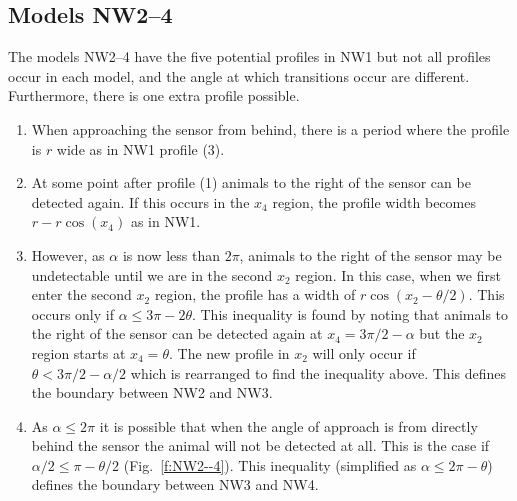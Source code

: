 \subsection{Models NW2--4} \label{NW2--4}
The models NW2--4 have the five potential profiles in NW1 but not all profiles occur in each model, and the angle at which transitions occur are different. Furthermore, there is one extra profile possible. 
\begin{enumerate}
\item When approaching the sensor from behind, there is a period where the profile is $r$ wide as in NW1 profile (3). 
\item At some point after profile (1) animals to the right of the sensor can be detected again. If this occurs in the $x_4$ region, the profile width becomes  $r - r\cos(x_4)$ as in NW1.
\item However, as $\alpha$ is now less than $2\pi$, animals to the right of the sensor may be undetectable until we are in the second $x_2$ region. In this case, when we first enter the second $x_2$ region, the profile has a width of $r\cos(x_2 - \theta/2)$. This occurs only if $\alpha \le 3\pi - 2\theta$. This inequality is found by noting that animals to the right of the sensor can be detected again at $x_4 = 3\pi/2 - \alpha$ but the $x_2$ region starts at $x_4 = \theta$. The new profile in $x_2$ will only occur if  $ \theta < 3\pi/2 - \alpha/2$ which is rearranged to find the inequality above. This defines the boundary between NW2 and NW3.
\item As $\alpha \le 2\pi$ it is possible that when the angle of approach is from directly behind the sensor the animal will not be detected at all. This is the case if $\alpha/2\le \pi-\theta/2$ (Fig.~\ref{f:NW2--4}). This inequality (simplified as $\alpha\le 2\pi-\theta$) defines the boundary between NW3 and NW4.
\end{enumerate}



